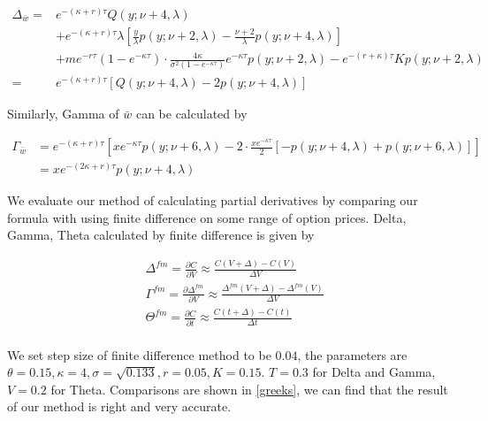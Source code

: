 \begin{equation}\label{delta}
    \begin{aligned}
        \Delta_{\bar{w}}=&  e^{ -(\kappa+r) \tau} Q(y ; \nu+4, \lambda) \\
        &+ e^{ -(\kappa+r) \tau} \lambda \left[\frac{y}{\lambda} p(y ; \nu+2, \lambda)-\frac{\nu+2}{\lambda} p(y ; \nu+4, \lambda)\right]\\
        &+ m e^{-r \tau}(1-e^{-\kappa \tau}) \cdot \frac{4 \kappa}{\sigma^{2}(1-e^{-\kappa \tau})} e^{-\kappa \tau} p(y ; \nu+2, \lambda) -e^{-(r+\kappa) \tau} K  p(y ; \nu+2, \lambda) \\
        =& e^{ -(\kappa+r) \tau} [Q(y; \nu+4, \lambda)-2p(y ; \nu+4, \lambda)] 
        \end{aligned}
\end{equation}

Similarly, Gamma of $\bar{w}$ can be calculated by

\begin{equation}\label{gamma}
    \begin{aligned}
        \Gamma_{\bar{w}}&= e^{ -(\kappa+r) \tau} \left[x e^{-\kappa \tau} p(y ; \nu+6, \lambda)-2 \cdot \frac{x e^{-\kappa \tau}}{2} [-p(y ; \nu+4, \lambda)+p(y ; \nu+6, \lambda)]\right] \\
        &= xe^{ -(2\kappa+r) \tau}p(y;\nu+4,\lambda)
    \end{aligned}
\end{equation}

We evaluate our method of calculating partial derivatives by comparing our formula with using finite difference on some range of option prices. Delta, Gamma, Theta calculated by finite difference is given by

$$
\begin{aligned}
    &\Delta^{fm} = \frac{\partial C}{\partial V} \approx \frac{C(V+\Delta)-C(V)}{\Delta V} \\
    &\Gamma^{fm} = \frac{\partial \Delta^{fm}}{\partial V} \approx \frac{\Delta^{fm}(V+\Delta)-\Delta^{fm}(V)}{\Delta V} \\
    &\Theta^{fm} = \frac{\partial C}{\partial t} \approx \frac{C(t+\Delta)-C(t)}{\Delta t} \\
\end{aligned}
$$

\noindent We set step size of finite difference method to be $0.04$, the parameters are $\theta = 0.15, \kappa = 4,\sigma = \sqrt{0.133},r = 0.05, K = 0.15$. $T=0.3$ for Delta and Gamma, $V=0.2$ for Theta. Comparisons are shown in \ref{greeks}, we can find that the result of our method is right and very accurate.

